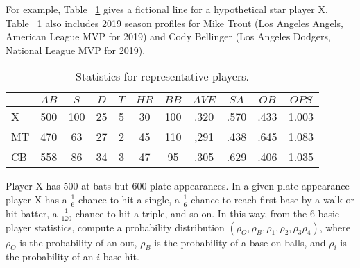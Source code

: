 \documentclass[12pt]{article}
\begin{document}
For example, Table~%
\ref{tab:baseball:playerstats} gives a fictional line for a hypothetical star
player X. Table~%
\ref{tab:baseball:playerstats} also includes 2019 season profiles for
Mike Trout (Los Angeles Angels, American League MVP for 2019) and Cody
Bellinger (Los Angeles Dodgers, National League MVP for 2019).
\begin{table}
    \centering
    \begin{tabular}{lcccccccccc}
        \toprule          & \(\mathit{AB}\) & \(S\) & \(D\) & \(T\) & \(\mathit{HR}\) & \(\mathit{BB}\) & \(\mathit{AVE}\) & \(SA\)  & \(OB\) & \(OPS\) \\ 
        \midrule X        & 500             & 100   & 25    & 5     & 30              & 100             & .320             & .570    & .433   & 1.003   \\ 
        MT                & 470             & 63    & 27    & 2     & 45              & 110             & ,291             & .438    & .645   & 1.083   \\ 
        CB                & 558             & 86    & 34    & 3     & 47              & 95              & .305             & .629    & .406   & 1.035   \\ 
        \bottomrule
    \end{tabular}
    \caption{Statistics for representative players.}%
    \label{tab:baseball:playerstats}
\end{table}
Player X has \( 500 \) at-bats but \( 600 \) plate appearances.  In a
given plate appearance player X has a \( \frac{1}{6} \) chance to hit a
single, a \( \frac{1}{6} \) chance to reach first base by a walk or hit
batter, a \( \frac{1}{120} \) chance to hit a triple, and so on.  In
this way, from the \( 6 \) basic player statistics, compute a
probability distribution \( (\rho_O, \rho_B, \rho_1, \rho_2, \rho_3 \rho_4)
\), where \( \rho_O \) is the probability of an out, \( \rho_B \) is the
probability of a base on balls, and \( \rho_i \) is the probability of
an \( i \)-base hit.
\end{document}
